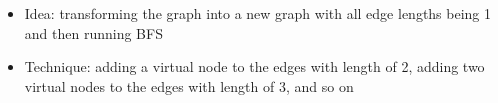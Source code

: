 \documentclass[mathserif]{beamer}
\begin{document}
{\begin{figure}[h]
\begin{tikzpicture}[auto,swap,scale=0.85]
%        
%
%
%        
%
%            	
%            
%                  	

\end{tikzpicture} 
	\label{WeightedBFSExample}
\end{figure}

\begin{itemize}
	\item Idea:  transforming the graph into a new graph with all edge lengths being 1 and then running BFS
	\item Technique:  adding a virtual node to the  edges with length of 2,  adding two virtual nodes to the edges with length of 3, and so on 
\end{itemize}
}
\end{document}
